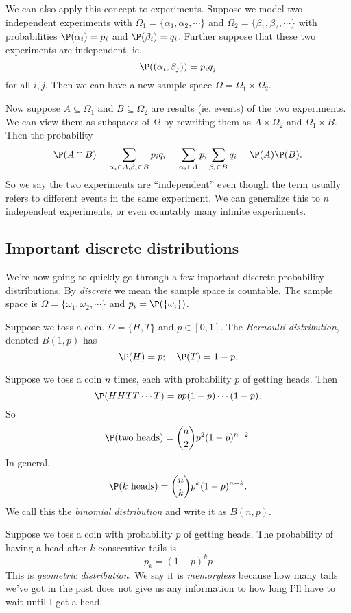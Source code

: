 \documentclass[a4paper]{article}
\begin{document}
We can also apply this concept to experiments. Suppose we model two independent experiments with $\Omega_1 = \{\alpha_1, \alpha_2, \cdots\}$  and $\Omega_2 = \{\beta_1, \beta_2, \cdots\}$ with probabilities $\P(\alpha_i) = p_i$ and $\P(\beta_i) = q_i$. Further suppose that these two experiments are independent, ie.
\[
  \P((\alpha_i, \beta_j)) = p_iq_j
\]
for all $i, j$. Then we can have a new sample space $\Omega = \Omega_1\times \Omega_2$.

Now suppose $A\subseteq \Omega_1$ and $B\subseteq \Omega_2$ are results (ie. events) of the two experiments. We can view them as subspaces of $\Omega$ by rewriting them as $A\times \Omega_2$ and $\Omega_1\times B$. Then the probability
\[
  \P(A\cap B) = \sum_{\alpha_i\in A, \beta_i\in B} p_iq_i = \sum_{\alpha_i\in A} p_i\sum_{\beta_i\in B}q_i = \P(A)\P(B).
\]
So we say the two experiments are ``independent'' even though the term usually refers to different events in the same experiment. We can generalize this to $n$ independent experiments, or even countably many infinite experiments.


\subsection{Important discrete distributions}
We're now going to quickly go through a few important discrete probability distributions. By \emph{discrete} we mean the sample space is countable. The sample space is $\Omega = \{\omega_1, \omega_2, \cdots\}$ and $p_i = \P(\{\omega_i\})$.

\begin{defi}
  Suppose we toss a coin. $\Omega=\{H, T\}$ and $p\in [0, 1]$. The \emph{Bernoulli distribution}, denoted $B(1, p)$ has
  \[
    \P(H) = p;\quad \P(T) = 1- p.
  \]
\end{defi}

\begin{defi}
  Suppose we toss a coin $n$ times, each with probability $p$ of getting heads. Then
  \[
    \P(HHTT\cdots T) = pp(1 - p)\cdots (1 - p).
  \]
  So
  \[
    \P(\text{two heads}) = \binom{n}{2}p^2(1 - p)^{n -2}.
  \]
  In general,
  \[
    \P(k\text{ heads}) = \binom{n}{k}p^k(1 - p)^{n - k}.
  \]
  We call this the \emph{binomial distribution} and write it as $B(n, p)$.
\end{defi}

\begin{defi}
  Suppose we toss a coin with probability $p$ of getting heads. The probability of having a head after $k$ consecutive tails is
  \[
    p_k = (1- p)^k p
  \]
  This is \emph{geometric distribution}. We say it is \emph{memoryless} because how many tails we've got in the past does not give us any information to how long I'll have to wait until I get a head.
\end{defi}
\end{document}
